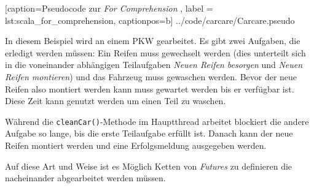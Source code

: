 
    [caption={Pseudocode zur \emph{For Comprehension} },
       label = lst:scala_for_comprehension,
       captionpos=b]
 {../code/carcare/Carcare.pseudo}
 
In diesem Beispiel wird an einem PKW gearbeitet. Es gibt zwei
Aufgaben, die erledigt werden müssen: Ein Reifen muss gewechselt werden
(dies unterteilt sich in die voneinander abhängigen Teilaufgaben
\emph{Neuen Reifen besorgen} und \emph{Neuen Reifen montieren}) und
das Fahrzeug muss gewaschen werden. Bevor der neue Reifen also montiert
werden kann muss gewartet werden bis er verfügbar ist. Diese Zeit
kann genutzt werden um einen Teil zu waschen.

Während die \texttt{cleanCar()}-Methode im Hauptthread arbeitet
blockiert die andere Aufgabe so lange, bis die erste Teilaufgabe
erfüllt ist. Danach kann der neue Reifen montiert werden und
eine Erfolgsmeldung ausgegeben werden.

Auf diese Art und Weise ist es Möglich Ketten von \emph{Futures}
zu definieren die nacheinander abgearbeitet werden müssen.
